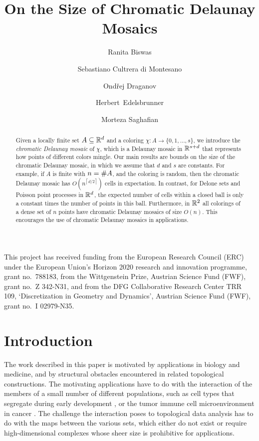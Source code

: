 \documentclass[a4paper]{article}
\title{On the Size of Chromatic Delaunay Mosaics}
\author{Ranita Biswas}
\author{Sebastiano Cultrera di Montesano}
\author{Ond\v{r}ej Draganov}
\author{Herbert~Edelsbrunner}
\author{Morteza Saghafian}
\affil{ISTA (Institute of Science and Technology Austria), Kloster\-neu\-burg, Austria}
\date{}
\newcommand {\mm}[1]   {\ifmmode{#1}\else{\mbox{\(#1\)}}\fi}
\newcommand {\ceiling}[1] {{\left\lceil #1 \right\rceil}}
\newcommand{\Rspace}        {\mm{{\mathbb R}}}
\newcommand{\card}[1]       {\mm{{\#}{#1}}}
\theoremstyle{definition}
\numberwithin{theorem}{section}
\numberwithin{equation}{section}
\begin{document}
\maketitle

\begin{abstract}
Given a locally finite set $A \subseteq \Rspace^d$ and a coloring $\chi \colon A \to \{0,1,\ldots,s\}$, we introduce the \emph{chromatic Delaunay mosaic} of $\chi$, which is a Delaunay mosaic in $\Rspace^{s+d}$ that represents how points of different colors mingle.
  Our main results are bounds on the size of the chromatic Delaunay mosaic, in which we assume that $d$ and $s$ are constants.
  For example, if $A$ is finite with $n = \card{A}$, and the coloring is random, then the chromatic Delaunay mosaic has $O(n^{\ceiling{d/2}})$ cells in expectation.
  In contrast, for Delone sets and Poisson point processes in $\Rspace^d$, the expected number of cells within a closed ball is only a constant times the number of points in this ball.
  Furthermore, in $\Rspace^2$ all colorings of a dense set of $n$ points have chromatic Delaunay mosaics of size $O(n)$.
  This encourages the use of chromatic Delaunay mosaics in applications.
\end{abstract}

\medskip
{\footnotesize
    This project has received funding from the European Research Council (ERC) under the European Union's Horizon 2020 research and innovation programme, grant no.\ 788183, from the Wittgenstein Prize, Austrian Science Fund (FWF), grant no.\ Z 342-N31, and from the DFG Collaborative Research Center TRR 109, `Discretization in Geometry and Dynamics', Austrian Science Fund (FWF), grant no.\ I 02979-N35.}


\section{Introduction}
\label{sec:1}

The work described in this paper is motivated by applications in biology and medicine, and by structural obstacles encountered in related topological constructions.
The motivating applications have to do with the interaction of the members of a small number of different populations, such as cell types that segregate during early development \cite{Hei12}, or the tumor immune cell microenvironment in cancer \cite{Bin18}.
The challenge the interaction poses to topological data analysis has to do with the maps between the various sets, which either do not exist or require high-dimensional complexes whose sheer size is prohibitive for applications.
\end{document}
